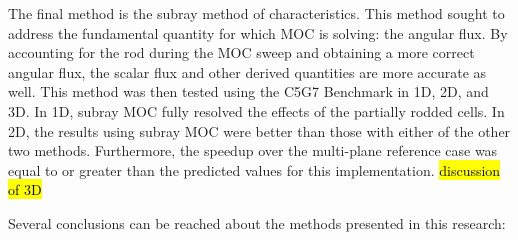 The final method is the subray method of characteristics.  This method sought to address the fundamental quantity for which MOC is solving: the angular flux.  By accounting for the rod during the MOC sweep and obtaining a more correct angular flux, the scalar flux and other derived quantities are more accurate as well.  This method was then tested using the C5G7 Benchmark in 1D, 2D, and 3D.  In 1D, subray MOC fully resolved the effects of the partially rodded cells.  In 2D, the results using subray MOC were better than those with either of the other two methods.  Furthermore, the speedup over the multi-plane reference case was equal to or greater than the predicted values for this implementation.  \hl{discussion of 3D}

Several conclusions can be reached about the methods presented in this research:

